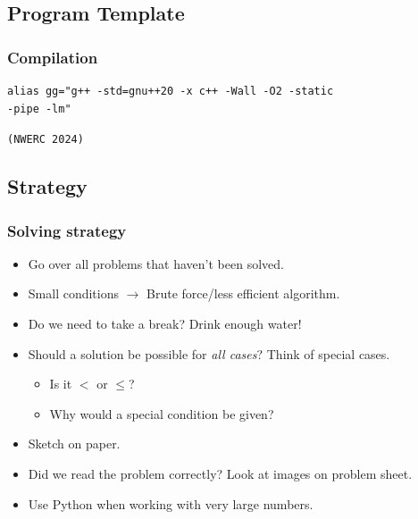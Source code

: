 

\subsection{Program Template}


\subsubsection{Compilation}
\begin{verbatim}
alias gg="g++ -std=gnu++20 -x c++ -Wall -O2 -static
-pipe -lm"
\end{verbatim}
{\color{gray}\texttt{(NWERC 2024)}}

\newpage

\subsection{Strategy}

\subsubsection{Solving strategy}
\begin{itemize}
    \item Go over all problems that haven't been solved.
    \item Small conditions $\rightarrow$ Brute force/less efficient algorithm.
    \item Do we need to take a break? Drink enough water!
    \item Should a solution be possible for \textit{all cases}? Think of special cases.
    \begin{itemize}
        \item Is it $<$ or $\leq$?
        \item Why would a special condition be given?
    \end{itemize}
    \item Sketch on paper.
    \item Did we read the problem correctly? Look at images on problem sheet.
    \item Use Python when working with very large numbers.
\end{itemize}

